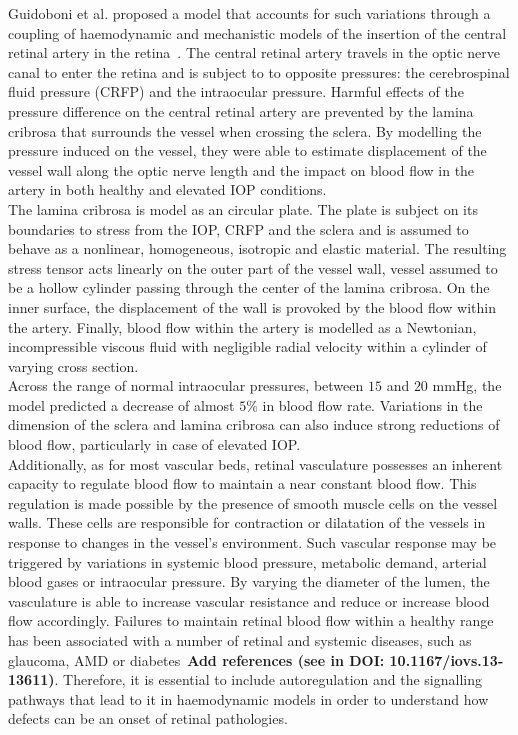 \documentclass[12pt,a4paper]{article}
\begin{document}
Guidoboni et al. proposed a model that accounts for such variations through a coupling of haemodynamic and mechanistic models of the insertion of the central retinal artery in the retina~\cite{Guidoboni_2014}.
The central retinal artery travels in the optic nerve canal to enter the retina and is subject to to opposite pressures: the cerebrospinal fluid pressure (CRFP) and the intraocular pressure.
Harmful effects of the pressure difference on the central retinal artery are prevented by the lamina cribrosa that surrounds the vessel when crossing the sclera.
By modelling the pressure induced on the vessel, they were able to estimate displacement of the vessel wall along the optic nerve length and the impact on blood flow in the artery in both healthy and elevated IOP conditions.\\
The lamina cribrosa is model as an circular plate.
The plate is subject on its boundaries to stress from the IOP, CRFP and the sclera and is assumed to behave as a nonlinear, homogeneous, isotropic and elastic material.
The resulting stress tensor acts linearly on the outer part of the vessel wall, vessel assumed to be a hollow cylinder passing through the center of the lamina cribrosa.
On the inner surface, the displacement of the wall is provoked by the blood flow within the artery.
Finally, blood flow within the artery is modelled as a Newtonian, incompressible viscous fluid with negligible radial velocity within a cylinder of varying cross section.\\
Across the range of normal intraocular pressures, between $15$ and $20$ mmHg, the model predicted a decrease of almost $5\%$ in blood flow rate.
Variations in the dimension of the sclera and lamina cribrosa can also induce strong reductions of blood flow, particularly in case of elevated IOP. \\


Additionally, as for most vascular beds, retinal vasculature possesses an inherent capacity to regulate blood flow to maintain a near constant blood flow.
This regulation is made possible by the presence of smooth muscle cells on the vessel walls.
These cells are responsible for contraction or dilatation of the vessels in response to changes in the vessel's environment.
Such vascular response may be triggered by variations in systemic blood pressure, metabolic demand, arterial blood gases or intraocular pressure.
By varying the diameter of the lumen, the vasculature is able to increase vascular resistance and reduce or increase blood flow accordingly. 
Failures to maintain retinal blood flow within a healthy range has been associated with a number of retinal and systemic diseases, such as glaucoma, AMD or diabetes~\textbf{Add references (see in DOI: 10.1167/iovs.13-13611)}.
Therefore, it is essential to include autoregulation and the signalling pathways that lead to it in haemodynamic models in order to understand how defects can be an onset of retinal pathologies.\\
\end{document}
